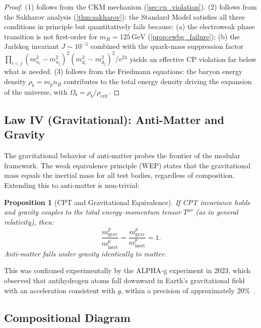 \documentclass[12pt]{article}
\newtheorem{proposition}[theorem]{Proposition}
\theoremstyle{definition}
\theoremstyle{remark}
\newcommand{\GeV}{\,\text{GeV}}
\begin{document}
\begin{proof}
(1) follows from the CKM mechanism (\cref{sec:cp_violation}).
(2) follows from the Sakharov analysis (\cref{thm:sakharov}): the
Standard Model satisfies all three conditions in principle but quantitatively
fails because: (a) the electroweak phase transition is not first-order for
$m_H = 125\GeV$ (\cref{prop:ewbg_failure}); (b) the Jarlskog invariant
$J \sim 10^{-5}$ combined with the quark-mass suppression factor
$\prod_{i<j}(m_{u_i}^2 - m_{u_j}^2)^2(m_{d_i}^2 - m_{d_j}^2)^2/v^{24}$
yields an effective CP violation far below what is needed.
(3) follows from the Friedmann equations: the baryon energy density
$\rho_b = m_p n_B$ contributes to the total energy density driving the expansion
of the universe, with $\Omega_b = \rho_b / \rho_{\text{crit}}$.
\end{proof}

\subsection{Law IV (Gravitational): Anti-Matter and Gravity}

The gravitational behavior of anti-matter probes the frontier of the modular framework.
The weak equivalence principle (WEP) states that the gravitational mass equals the
inertial mass for all test bodies, regardless of composition. Extending this to
anti-matter is non-trivial:

\begin{proposition}[CPT and Gravitational Equivalence]
\label{prop:cpt_gravity}
If CPT invariance holds and gravity couples to the total energy--momentum tensor
$T^{\mu\nu}$ (as in general relativity), then:
\begin{equation}
\frac{m_{\text{grav}}^{\bar{p}}}{m_{\text{inert}}^{\bar{p}}} = \frac{m_{\text{grav}}^{p}}{m_{\text{inert}}^{p}} = 1.
\end{equation}
Anti-matter falls under gravity identically to matter.
\end{proposition}

This was confirmed experimentally by the ALPHA-g experiment in 2023, which observed
that antihydrogen atoms fall downward in Earth's gravitational field with an acceleration
consistent with $g$, within a precision of approximately 20\%~\cite{ALPHA2023}.

\subsection{Compositional Diagram}
\end{document}
